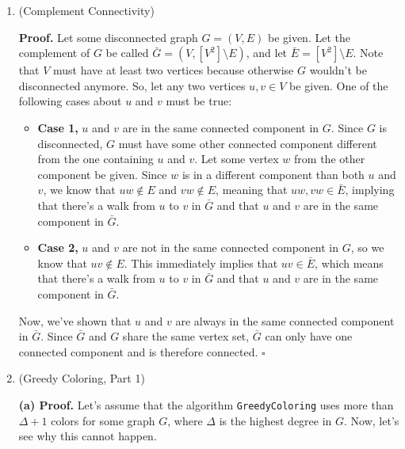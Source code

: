 \documentclass{article}
\begin{document}
\begin{enumerate}
    \pagebreak

  \item (Complement Connectivity)

    \textbf{Proof.} Let some disconnected graph $G = (V, E)$ be given. Let the complement of $G$ be called $\bar{G} = (V, [V^2] \setminus E)$, and let $\bar{E} = [V^2] \setminus E$. Note that $V$ must have at least two vertices because otherwise $G$ wouldn't be disconnected anymore. So, let any two vertices $u, v \in V$ be given. One of the following cases about $u$ and $v$ must be true:
    \begin{itemize}
      \item \textbf{Case 1,} $u$ and $v$ are in the same connected component in $G$. Since $G$ is disconnected, $G$ must have some other connected component different from the one containing $u$ and $v$. Let some vertex $w$ from the other component be given. Since $w$ is in a different component than both $u$ and $v$, we know that $uw \notin E$ and $vw \notin E$, meaning that $uw, vw \in \bar{E}$, implying that there's a walk from $u$ to $v$ in $\bar{G}$ and that $u$ and $v$ are in the same component in $\bar{G}$.
      \item \textbf{Case 2,} $u$ and $v$ are not in the same connected component in $G$, so we know that $uv \notin E$. This immediately implies that $uv \in \bar{E}$, which means that there's a walk from $u$ to $v$ in $\bar{G}$ and that $u$ and $v$ are in the same component in $\bar{G}$.
    \end{itemize}
    Now, we've shown that $u$ and $v$ are always in the same connected component in $\bar{G}$. Since $\bar{G}$ and $G$ share the same vertex set, $\bar{G}$ can only have one connected component and is therefore connected. $\square$

    \pagebreak

  \item (Greedy Coloring, Part 1)

    \textbf{(a) Proof.} Let's assume that the algorithm \texttt{GreedyColoring} uses more than $\Delta + 1$ colors for some graph $G$, where $\Delta$ is the highest degree in $G$. Now, let's see why this cannot happen.


\end{enumerate}
\end{document}
